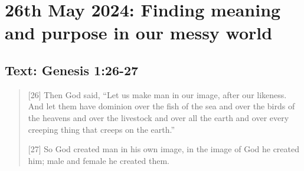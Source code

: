 \setcounter{figure}{0}

\section{26th May 2024: Finding meaning and purpose in our messy world}
\subsection*{Text: Genesis 1:26-27}
  \begin{quote}
    [26] Then God said, “Let us make man in our image, after our likeness. And let them have dominion over the fish of the sea and over the birds of the heavens and over the livestock and over all the earth and over every creeping thing that creeps on the earth.”

    [27] So God created man in his own image, in the image of God he created
    him; male and female he created them.
  \end{quote}
